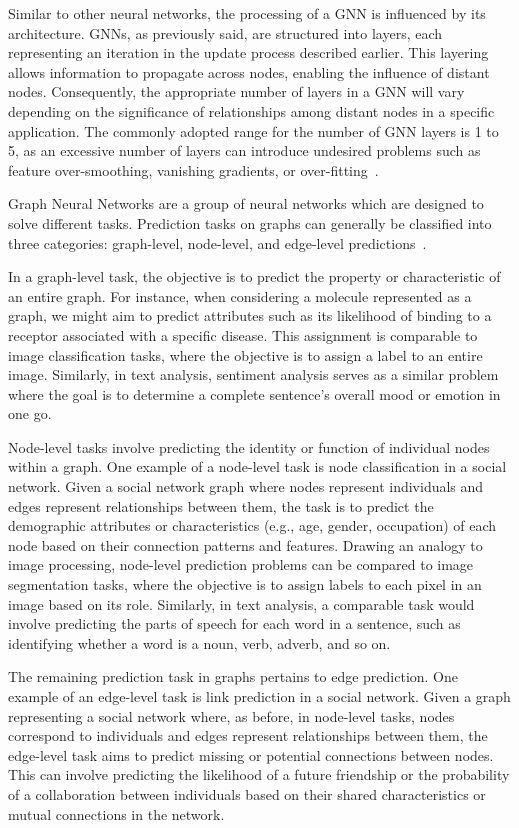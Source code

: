 Similar to other neural networks, the processing of a GNN is influenced by its architecture.
GNNs, as previously said, are structured into layers, each representing an iteration in the update process described earlier.
This layering allows information to propagate across nodes, enabling the influence of distant nodes.
Consequently, the appropriate number of layers in a GNN will vary depending on the significance of relationships among distant nodes in a specific application.
The commonly adopted range for the number of GNN layers is 1 to 5, as an excessive number of layers can introduce undesired problems such as feature over-smoothing, vanishing gradients, or over-fitting~\cite{DBLP:journals/corr/abs-1801-07606}.

Graph Neural Networks are a group of neural networks which are designed to solve different tasks.
Prediction tasks on graphs can generally be classified into three categories: graph-level, node-level, and edge-level predictions~\cite{sanchez-lengeling2021a}.

In a graph-level task, the objective is to predict the property or characteristic of an entire graph.
For instance, when considering a molecule represented as a graph, we might aim to predict attributes such as its likelihood of binding to a receptor associated with a specific disease.
This assignment is comparable to image classification tasks, where the objective is to assign a label to an entire image.
Similarly, in text analysis, sentiment analysis serves as a similar problem where the goal is to determine a complete sentence's overall mood or emotion in one go.

Node-level tasks involve predicting the identity or function of individual nodes within a graph.
One example of a node-level task is node classification in a social network.
Given a social network graph where nodes represent individuals and edges represent relationships between them, the task is to predict the demographic attributes or characteristics (e.g., age, gender, occupation) of each node based on their connection patterns and features.
Drawing an analogy to image processing, node-level prediction problems can be compared to image segmentation tasks, where the objective is to assign labels to each pixel in an image based on its role.
Similarly, in text analysis, a comparable task would involve predicting the parts of speech for each word in a sentence, such as identifying whether a word is a noun, verb, adverb, and so on.


The remaining prediction task in graphs pertains to edge prediction.
One example of an edge-level task is link prediction in a social network.
Given a graph representing a social network where, as before, in node-level tasks, nodes correspond to individuals and edges represent relationships between them, the edge-level task aims to predict missing or potential connections between nodes.
This can involve predicting the likelihood of a future friendship or the probability of a collaboration between individuals based on their shared characteristics or mutual connections in the network.

